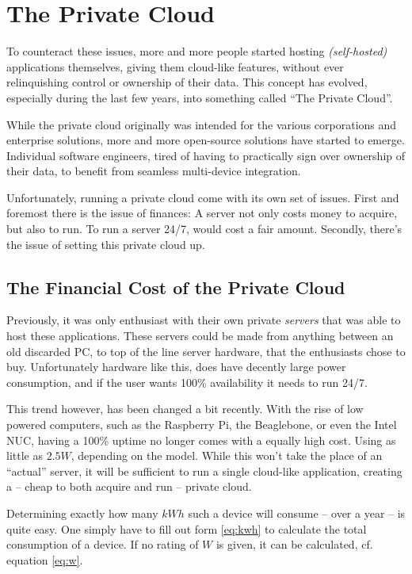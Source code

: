 	\section{The Private Cloud}
		To counteract these issues, more and more people started hosting \emph{(self-hosted)} applications themselves, giving them cloud-like features, without ever relinquishing control or ownership of their data. This concept has evolved, especially during the last few years, into something called ``The Private Cloud''. 

		While the private cloud originally was intended for the various corporations and enterprise solutions, more and more open-source solutions have started to emerge. Individual software engineers, tired of having to practically sign over ownership of their data, to benefit from seamless multi-device integration. 

		Unfortunately, running a private cloud come with its own set of issues. First and foremost there is the issue of finances: A server not only costs money to acquire, but also to run. To run a server 24/7, would cost a fair amount. Secondly, there's the issue of setting this private cloud up. 

		\subsection*{The Financial Cost of the Private Cloud}
			Previously, it was only enthusiast with their own private \emph{servers} that was able to host these applications. These servers could be made from anything between an old discarded PC, to top of the line server hardware, that the enthusiasts chose to buy. Unfortunately hardware like this, does have decently large power consumption, and if the user wants 100\% availability it needs to run 24/7.

			This trend however, has been changed a bit recently. With the rise of low powered computers, such as the Raspberry Pi, the Beaglebone, or even the Intel NUC, having a 100\% uptime no longer comes with a equally high cost. Using as little as $2.5W$, depending on the model. While this won't take the place of an ``actual'' server, it will be sufficient to run a single cloud-like application, creating a -- cheap to both acquire and run -- private cloud.

			Determining exactly how many $kWh$ such a device will consume -- over a year -- is quite easy. One simply have to fill out form \ref{eq:kwh} to calculate the total consumption of a device. If no rating of $W$ is given, it can be calculated, cf. equation \ref{eq:w}.

